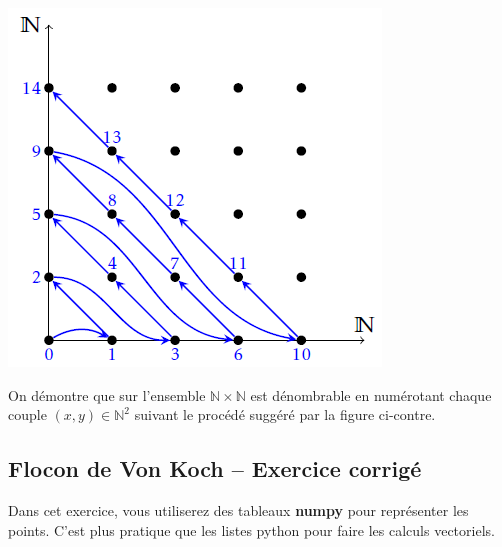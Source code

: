 \begin{marginfigure}
\includegraphics[width=\linewidth]{images/fig_01}
\end{marginfigure}

On démontre que sur l'ensemble $\mathbb{N}\times \mathbb{N}$ est dénombrable en numérotant chaque couple $(x,y)\in\mathbb{N}^2$ suivant le procédé suggéré par la figure ci-contre.





\subsection*{Flocon de Von Koch -- Exercice corrigé}



Dans cet exercice, vous utiliserez des tableaux \textbf{numpy} pour représenter les points. C'est plus pratique que les 
listes python pour faire les calculs vectoriels.

